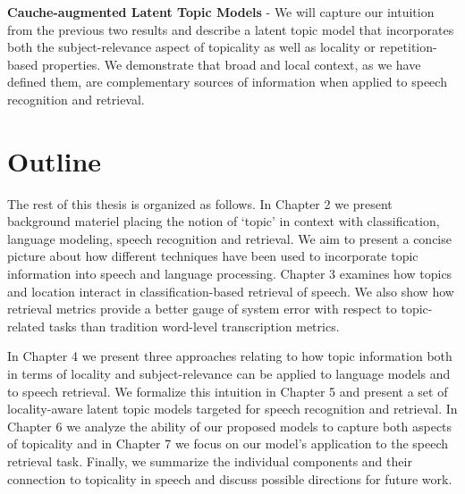 \textbf{Cauche-augmented Latent Topic Models} -  We will capture our intuition from the previous two results and describe a latent topic model that incorporates both the subject-relevance aspect of topicality as well as locality or repetition-based properties.  We demonstrate that broad and local context, as we have defined them, are complementary sources of information when applied to speech recognition and retrieval.  


\section{Outline}
\label{sec:outline}

The rest of this thesis is organized as follows.   In Chapter 2 we present background materiel placing the notion of `topic' in context with classification, language modeling, speech recognition and retrieval.  We aim to present a concise picture about how different techniques have been used to incorporate topic information into speech and language processing.   Chapter 3 examines how topics and location interact in classification-based retrieval of speech.  We also show how retrieval metrics provide a better gauge of system error with respect to topic-related tasks than tradition word-level transcription metrics.

In Chapter 4 we present three approaches relating to how topic information both in terms of locality and subject-relevance can be applied to language models and to speech retrieval.   We formalize this intuition in Chapter 5 and present a set of locality-aware latent topic models targeted for speech recognition and retrieval.   In Chapter 6 we analyze the ability of our proposed models to capture both aspects of topicality and in Chapter 7 we focus on our model's application to the speech retrieval task.  Finally, we summarize the individual components and their connection to topicality in speech and discuss possible directions for future work.
